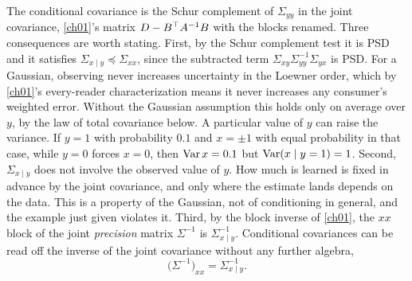 The conditional covariance is the Schur complement of $\Sigma_{yy}$ in the
joint covariance, \cref{ch01}'s matrix $D-B^{\top} A^{-1}B$ with the blocks renamed.
Three consequences are worth stating. First, by the Schur complement test it
is PSD and it satisfies $\Sigma_{x\mid y}\preceq\Sigma_{xx}$, since the
subtracted term $\Sigma_{xy}\Sigma_{yy}^{-1}\Sigma_{yx}$ is PSD. For a Gaussian,
observing never increases uncertainty in the Loewner order, which by
\cref{ch01}'s every-reader characterization means it never increases any
consumer's weighted error. Without the Gaussian assumption this holds only on
average over $y$, by the law of total covariance below. A particular value of
$y$ can raise the variance. If $y=1$ with probability $0.1$ and $x=\pm1$ with
equal probability in that case, while $y=0$ forces $x=0$, then $\operatorname{Var} x=0.1$ but
$\operatorname{Var}(x\mid y=1)=1$. Second, $\Sigma_{x\mid y}$ does not involve the observed
value of $y$. How much is learned is fixed in advance by the joint covariance,
and only where the estimate lands depends on the data. This is a property of
the Gaussian, not of conditioning in general, and the example just given
violates it. Third, by the block inverse of \cref{ch01}, the $xx$ block of the
joint \emph{precision} matrix $\Sigma^{-1}$ is $\Sigma_{x\mid y}^{-1}$.
Conditional covariances can be read off the inverse of the joint covariance
without any further algebra,
\begin{equation}\label{eq:ch02:precision}
\big(\Sigma^{-1}\big)_{xx}=\Sigma_{x\mid y}^{-1}.
\end{equation}

